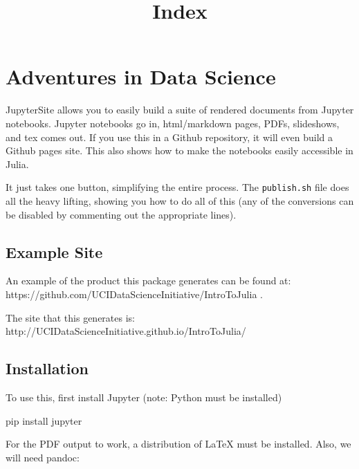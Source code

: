 \documentclass[11pt]{article}
\title{Index}
\newenvironment{Shaded}{}{}
\newcommand{\NormalTok}[1]{{#1}}
\newcommand{\ExtensionTok}[1]{{#1}}
\begin{document}
    
    
    \maketitle
    
    

    
    \section{Adventures in Data Science}\label{adventures-in-data-science}

    JupyterSite allows you to easily build a suite of rendered documents
from Jupyter notebooks. Jupyter notebooks go in, html/markdown pages,
PDFs, slideshows, and tex comes out. If you use this in a Github
repository, it will even build a Github pages site. This also shows how
to make the notebooks easily accessible in Julia.

It just takes one button, simplifying the entire process. The
\texttt{publish.sh} file does all the heavy lifting, showing you how to
do all of this (any of the conversions can be disabled by commenting out
the appropriate lines).

    \subsection{Example Site}\label{example-site}

An example of the product this package generates can be found at:
https://github.com/UCIDataScienceInitiative/IntroToJulia .

The site that this generates is:
http://UCIDataScienceInitiative.github.io/IntroToJulia/

    \subsection{Installation}\label{installation}

To use this, first install Jupyter (note: Python must be installed)

\begin{Shaded}
\begin{Highlighting}[]
\ExtensionTok{pip}\NormalTok{ install jupyter}
\end{Highlighting}
\end{Shaded}

For the PDF output to work, a distribution of LaTeX must be installed.
Also, we will need pandoc:
\end{document}
